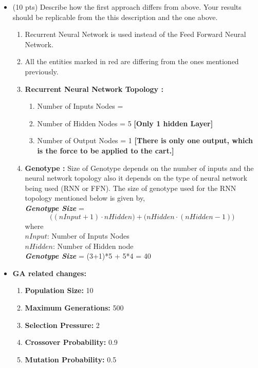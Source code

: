 \documentclass{article}
\begin{document}
\begin{itemize}
	\item (10 pts) Describe how the first approach differs from above. Your results should be replicable from the this description and the one above.
	\color{blue}
\begin{enumerate}
	\item Recurrent Neural Network is used instead of the Feed Forward Neural Network.
	\item All the entities marked in red are differing from the ones mentioned previously.
	\item \textbf{Recurrent Neural Network Topology :}
	\begin{enumerate}
	\item Number of Inputs Nodes = \color{red}{3 = [Cart Position, Pole1 Position, Pole2 Position]} \color{blue}
	\item Number of Hidden Nodes = 5 \textbf{[Only 1 hidden Layer]}
	\item Number of Output Nodes = 1 \textbf{[There is only one output, which is the force to be applied to the cart.]}
	\end{enumerate}
	\item \textbf{Genotype :} Size of Genotype depends on the number of inputs and the neural network topology also it depends on the type of neural network being used (RNN or FFN). The size of genotype used for the RNN topology mentioned below is given by, \\
    \textit{\textbf{Genotype Size}} = \color{red}$$\big( (nInput+1) \cdot nHidden \big) + \big( nHidden \cdot (nHidden-1) \big)$$ where\\ $nInput$: Number of Inputs Nodes \\$nHidden$: Number of Hidden node\color{blue}\\
	\textbf{\textit{Genotype Size}} = \color{red}(3+1)*5 + 5*4 = 40\color{blue}
\end{enumerate}
\item \textbf{GA related changes:}
\begin{enumerate}
\item \textbf{Population Size:} 10
\item \textbf{Maximum Generations:} \color{red}500\color{blue}
\item \textbf{Selection Pressure:} 2
\item \textbf{Crossover Probability:} 0.9
\item \textbf{Mutation Probability:} \color{red}0.5\color{blue}
\end{enumerate}

\end{itemize}
\end{document}
